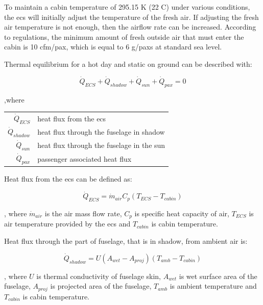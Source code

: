 \documentclass[english]{kththesis}
\begin{document}
 To maintain a cabin temperature of 295.15 K (22 \degree C) under various conditions, the \acrshort{ecs} will initially adjust the temperature of the fresh air. If adjusting the fresh air temperature is not enough, then the airflow rate can be increased. According to regulations, the minimum amount of fresh outside air that must enter the cabin is 10 cfm/pax, which is equal to 6 g/paxs at standard sea level.

Thermal equilibrium for a hot day and static on ground can be described
with:

\begin{equation}
\dot{Q}_{ECS} + \dot{Q}_{shadow} + \dot{Q}_{sun} + \dot{Q}_{pax}  = 0
\end{equation}

,where 

\begin{center}
\begin{tabular}{ r l }
 $\dot{Q}_{ECS}$ & heat flux from the \acrshort{ecs}\\ 
 $\dot{Q}_{shadow}$ & heat flux through the fuselage in shadow\\  
 $\dot{Q}_{sun}$ & heat flux through the fuselage in the sun\\
 $\dot{Q}_{pax}$ & passenger associated heat flux
\end{tabular}
\end{center}

Heat flux from the \acrshort{ecs} can be defined as:

\begin{equation}
\label{eq:QECS}
\dot{Q}_{ECS} = \dot{m}_{air} C_p (T_{ECS} - T_{cabin})
\end{equation}

, where $\dot{m}_{air}$ is the air mass flow rate, $C_p$ is specific heat capacity of air, $T_{ECS}$ is air temperature provided by the \acrshort{ecs} and $T_{cabin}$ is cabin temperature.

Heat flux through the part of fuselage, that is in shadow, from ambient
air is:

\begin{equation}
\dot{Q}_{shadow} = U(A_{wet} - A_{proj})(T_{amb} - T_{cabin})
\end{equation}

, where $U$ is thermal conductivity of fuselage skin, $A_{wet}$ is wet surface area of the fuselage, $A_{proj}$ is projected area of the fuselage, $T_{amb}$ is ambient temperature and $T_{cabin}$ is cabin temperature.
\end{document}
